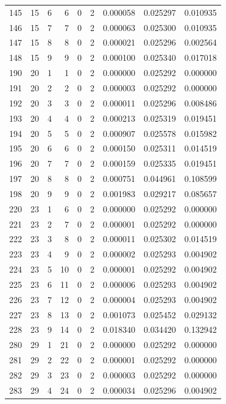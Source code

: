 \begin{longtable}{rrrrrrrrr}
145 & 15 & 6 & 6 & 0 & 2 & 0.000058 & 0.025297 & 0.010935 \\
146 & 15 & 7 & 7 & 0 & 2 & 0.000063 & 0.025300 & 0.010935 \\
147 & 15 & 8 & 8 & 0 & 2 & 0.000021 & 0.025296 & 0.002564 \\
148 & 15 & 9 & 9 & 0 & 2 & 0.000100 & 0.025340 & 0.017018 \\
190 & 20 & 1 & 1 & 0 & 2 & 0.000000 & 0.025292 & 0.000000 \\
191 & 20 & 2 & 2 & 0 & 2 & 0.000003 & 0.025292 & 0.000000 \\
192 & 20 & 3 & 3 & 0 & 2 & 0.000011 & 0.025296 & 0.008486 \\
193 & 20 & 4 & 4 & 0 & 2 & 0.000213 & 0.025319 & 0.019451 \\
194 & 20 & 5 & 5 & 0 & 2 & 0.000907 & 0.025578 & 0.015982 \\
195 & 20 & 6 & 6 & 0 & 2 & 0.000150 & 0.025311 & 0.014519 \\
196 & 20 & 7 & 7 & 0 & 2 & 0.000159 & 0.025335 & 0.019451 \\
197 & 20 & 8 & 8 & 0 & 2 & 0.000751 & 0.044961 & 0.108599 \\
198 & 20 & 9 & 9 & 0 & 2 & 0.001983 & 0.029217 & 0.085657 \\
220 & 23 & 1 & 6 & 0 & 2 & 0.000000 & 0.025292 & 0.000000 \\
221 & 23 & 2 & 7 & 0 & 2 & 0.000001 & 0.025292 & 0.000000 \\
222 & 23 & 3 & 8 & 0 & 2 & 0.000011 & 0.025302 & 0.014519 \\
223 & 23 & 4 & 9 & 0 & 2 & 0.000002 & 0.025293 & 0.004902 \\
224 & 23 & 5 & 10 & 0 & 2 & 0.000001 & 0.025292 & 0.004902 \\
225 & 23 & 6 & 11 & 0 & 2 & 0.000006 & 0.025293 & 0.004902 \\
226 & 23 & 7 & 12 & 0 & 2 & 0.000004 & 0.025293 & 0.004902 \\
227 & 23 & 8 & 13 & 0 & 2 & 0.001073 & 0.025452 & 0.029132 \\
228 & 23 & 9 & 14 & 0 & 2 & 0.018340 & 0.034420 & 0.132942 \\
280 & 29 & 1 & 21 & 0 & 2 & 0.000000 & 0.025292 & 0.000000 \\
281 & 29 & 2 & 22 & 0 & 2 & 0.000001 & 0.025292 & 0.000000 \\
282 & 29 & 3 & 23 & 0 & 2 & 0.000003 & 0.025292 & 0.000000 \\
283 & 29 & 4 & 24 & 0 & 2 & 0.000034 & 0.025296 & 0.004902 \\

\end{longtable}

